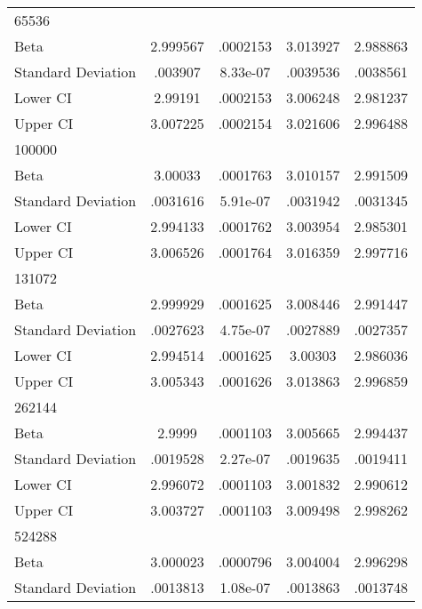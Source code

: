 {\begin{tabular}{l*{1}{cccc}}
\hline
65536               &            &            &            &            \\
Beta                &    2.999567&    .0002153&    3.013927&    2.988863\\
Standard Deviation  &     .003907&    8.33e-07&    .0039536&    .0038561\\
Lower CI            &     2.99191&    .0002153&    3.006248&    2.981237\\
Upper CI            &    3.007225&    .0002154&    3.021606&    2.996488\\
\hline
100000              &            &            &            &            \\
Beta                &     3.00033&    .0001763&    3.010157&    2.991509\\
Standard Deviation  &    .0031616&    5.91e-07&    .0031942&    .0031345\\
Lower CI            &    2.994133&    .0001762&    3.003954&    2.985301\\
Upper CI            &    3.006526&    .0001764&    3.016359&    2.997716\\
\hline
131072              &            &            &            &            \\
Beta                &    2.999929&    .0001625&    3.008446&    2.991447\\
Standard Deviation  &    .0027623&    4.75e-07&    .0027889&    .0027357\\
Lower CI            &    2.994514&    .0001625&     3.00303&    2.986036\\
Upper CI            &    3.005343&    .0001626&    3.013863&    2.996859\\
\hline
262144              &            &            &            &            \\
Beta                &      2.9999&    .0001103&    3.005665&    2.994437\\
Standard Deviation  &    .0019528&    2.27e-07&    .0019635&    .0019411\\
Lower CI            &    2.996072&    .0001103&    3.001832&    2.990612\\
Upper CI            &    3.003727&    .0001103&    3.009498&    2.998262\\
\hline
524288              &            &            &            &            \\
Beta                &    3.000023&    .0000796&    3.004004&    2.996298\\
Standard Deviation  &    .0013813&    1.08e-07&    .0013863&    .0013748\\

\end{tabular}}
